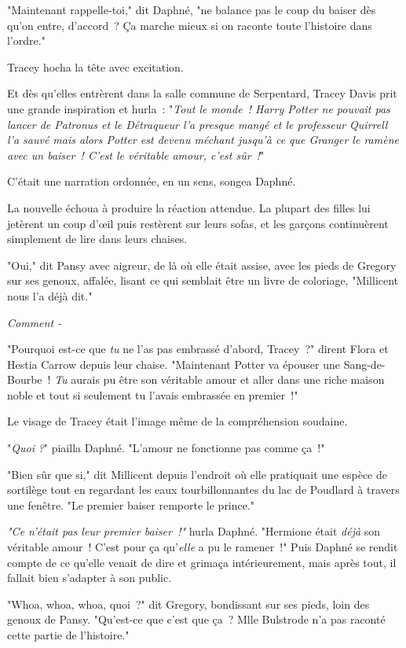 "Maintenant rappelle-toi," dit Daphné, "ne balance pas le coup du baiser dès qu'on entre, d'accord~? Ça marche mieux si on raconte toute l'histoire dans l'ordre."

Tracey hocha la tête avec excitation.

Et dès qu'elles entrèrent dans la salle commune de Serpentard, Tracey Davis prit une grande inspiration et hurla~: "\emph{Tout le monde~! Harry Potter ne pouvait pas lancer de Patronus et le Détraqueur l'a presque mangé et le professeur Quirrell l'a sauvé mais alors Potter est devenu méchant jusqu'à ce que Granger le ramène avec un baiser~! C'est le véritable amour, c'est sûr~!}"

C'était une narration ordonnée, en un sens, songea Daphné.

La nouvelle échoua à produire la réaction attendue. La plupart des filles lui jetèrent un coup d'œil puis restèrent sur leurs sofas, et les garçons continuèrent simplement de lire dans leurs chaises.

"Oui," dit Pansy avec aigreur, de là où elle était assise, avec les pieds de Gregory sur ses genoux, affalée, lisant ce qui semblait être un livre de coloriage, "Millicent nous l'a déjà dit."

\emph{Comment -}

"Pourquoi est-ce que \emph{tu} ne l'as pas embrassé d'abord, Tracey~?" dirent Flora et Hestia Carrow depuis leur chaise. "Maintenant Potter va épouser une Sang-de-Bourbe~! \emph{Tu} aurais pu être son véritable amour et aller dans une riche maison noble et tout si seulement tu l'avais embrassée en premier~!"

Le visage de Tracey était l'image même de la compréhension soudaine.

"\emph{Quoi} \emph{?}" piailla Daphné. "L'amour ne fonctionne pas comme ça~!"

"Bien sûr que si," dit Millicent depuis l'endroit où elle pratiquait une espèce de sortilège tout en regardant les eaux tourbillonnantes du lac de Poudlard à travers une fenêtre. "Le premier baiser remporte le prince."

\emph{"Ce n'était pas leur premier baiser~!"} hurla Daphné. "Hermione était \emph{déjà} son véritable amour~! C'est pour ça qu'\emph{elle} a pu le ramener~!" Puis Daphné se rendit compte de ce qu'elle venait de dire et grimaça intérieurement, mais après tout, il fallait bien s'adapter à son public.

"Whoa, whoa, whoa, quoi~?" dit Gregory, bondissant sur ses pieds, loin des genoux de Pansy. "Qu'est-ce que c'est que ça~? Mlle Bulstrode n'a pas raconté cette partie de l'histoire."

